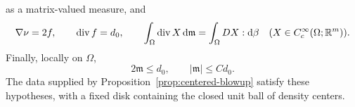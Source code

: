 \begin{proposition}
\begin{equation}
\end{equation}
as a matrix-valued measure, and
\begin{equation}\label{eq:limit-identities}
 \nabla\nu=2f,\qquad \operatorname{div} f=d_0,\qquad
 \int_\Omega\operatorname{div} X\,\mathrm d\mathfrak m
   =\int_\Omega DX:\mathrm d\beta
 \quad (X\in C_c^\infty(\Omega;\mathbb R^m)).
\end{equation}
Finally, locally on $\Omega$,
\begin{equation}\label{eq:limit-sign}
             2\mathfrak m\le d_0,\qquad
             |\mathfrak m|\le C d_0.
\end{equation}
The data supplied by Proposition~\ref{prop:centered-blowup} satisfy these
hypotheses, with a fixed disk containing the closed unit ball of density
centers.
\end{proposition}

